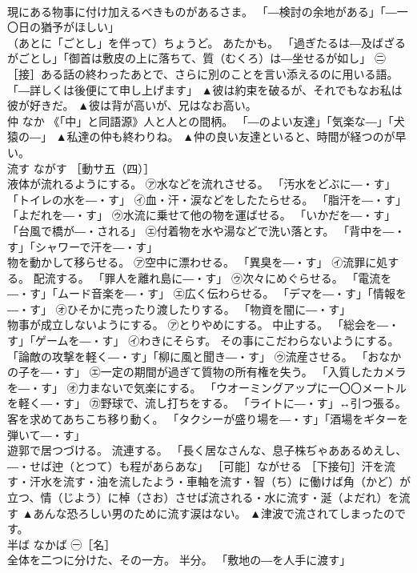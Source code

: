 \documentclass[8pt]{extreport}
\begin{document}
\begin{CJK}{UTF8}{min}
\\	現にある物事に付け加えるべきものがあるさま。 「―検討の余地がある」「―一〇日の猶予がほしい」 
\\	（あとに「ごとし」を伴って）ちょうど。 あたかも。 「過ぎたるは―及ばざるがごとし」「御首は敷皮の上に落ちて、質（むくろ）は―坐せるが如し」 ㊁［接］ある話の終わったあとで、さらに別のことを言い添えるのに用いる語。 「―詳しくは後便にて申し上げます」	▲彼は約束を破るが、それでもなお私は彼が好きだ。 ▲彼は背が高いが、兄はなお高い。
\\	仲	なか	《「中」と同語源》人と人との間柄。 「―のよい友達」「気楽な―」「犬猿の―」	▲私達の仲も終わりね。 ▲仲の良い友達といると、時間が経つのが早い。
\\	流す	ながす	［動サ五（四）］ 
\\	液体が流れるようにする。 ㋐水などを流れさせる。 「汚水をどぶに―・す」「トイレの水を―・す」 ㋑血・汗・涙などをしたたらせる。 「脂汗を―・す」「よだれを―・す」 ㋒水流に乗せて他の物を運ばせる。 「いかだを―・す」「台風で橋が―・される」 ㋓付着物を水や湯などで洗い落とす。 「背中を―・す」「シャワーで汗を―・す」 
\\	物を動かして移らせる。 ㋐空中に漂わせる。 「異臭を―・す」 ㋑流罪に処する。 配流する。 「罪人を離れ島に―・す」 ㋒次々にめぐらせる。 「電流を―・す」「ムード音楽を―・す」 ㋓広く伝わらせる。 「デマを―・す」「情報を―・す」 ㋔ひそかに売ったり渡したりする。 「物資を闇に―・す」 
\\	物事が成立しないようにする。 ㋐とりやめにする。 中止する。 「総会を―・す」「ゲームを―・す」 ㋑わきにそらす。 その事にこだわらないようにする。 「論敵の攻撃を軽く―・す」「柳に風と聞き―・す」 ㋒流産させる。 「おなかの子を―・す」 ㋓一定の期間が過ぎて質物の所有権を失う。 「入質したカメラを―・す」 ㋔力まないで気楽にする。 「ウオーミングアップに一〇〇メートルを軽く―・す」 ㋕野球で、流し打ちをする。 「ライトに―・す」↔引つ張る。 
\\	客を求めてあちこち移り動く。 「タクシーが盛り場を―・す」「酒場をギターを弾いて―・す」 
\\	遊郭で居つづける。 流連する。 「長く居なさんな、息子株ぢゃああるめえし、―・せば迚（とつて）も程があらあな」 ［可能］ながせる ［下接句］汗を流す・汗水を流す・油を流したよう・車軸を流す・智（ち）に働けば角（かど）が立つ、情（じよう）に棹（さお）させば流される・水に流す・涎（よだれ）を流す	▲あんな恐ろしい男のために流す涙はない。 ▲津波で流されてしまったのです。
\\	半ば	なかば	㊀［名］ 
\\	全体を二つに分けた、その一方。 半分。 「敷地の―を人手に渡す」 

\end{CJK}
\end{document}

